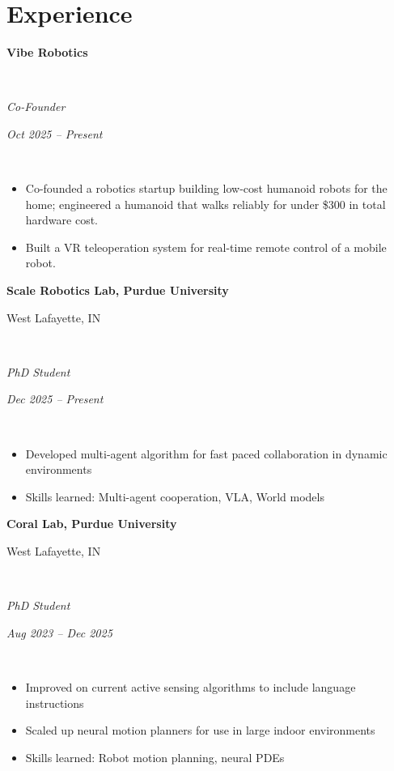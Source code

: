 \documentclass[10pt,letterpaper]{article}
\newcommand{\resumeSubheading}[4]{%
  \begin{minipage}[t]{0.74\textwidth}\raggedright\textbf{#1}\end{minipage}\hfill
  \begin{minipage}[t]{0.23\textwidth}\raggedleft #2\end{minipage}\\[2pt]
  \begin{minipage}[t]{0.74\textwidth}\raggedright\textit{#3}\end{minipage}\hfill
  \begin{minipage}[t]{0.23\textwidth}\raggedleft\textit{#4}\end{minipage}\\[-2pt]
}
\newcommand{\resumeGap}{\vspace{5pt}}
\begin{document}
\section{Experience}
\resumeSubheading
  {Vibe Robotics}
  {}
  {Co-Founder}
  {Oct 2025 -- Present}
\begin{itemize}
    \vspace{-7pt}
    \item Co-founded a robotics startup building low-cost humanoid robots for the home; engineered a humanoid that walks reliably for under \$300 in total hardware cost.
    \item Built a VR teleoperation system for real-time remote control of a mobile robot.
\end{itemize}
\resumeGap
\resumeSubheading
  {Scale Robotics Lab, Purdue University}
  {West Lafayette, IN}
  {PhD Student}
  {Dec 2025 -- Present}
\begin{itemize}
    \vspace{-7pt}
    \item Developed multi-agent algorithm for fast paced collaboration in dynamic environments
    \item Skills learned: Multi-agent cooperation, VLA, World models
\end{itemize}
\resumeGap
\resumeSubheading
  {Coral Lab, Purdue University}
  {West Lafayette, IN}
  {PhD Student}
  {Aug 2023 -- Dec 2025}
\begin{itemize}
    \vspace{-7pt}
    \item Improved on current active sensing algorithms to include language instructions
    \item Scaled up neural motion planners for use in large indoor environments
    \item Skills learned: Robot motion planning, neural PDEs
\end{itemize}
\resumeGap
\end{document}
